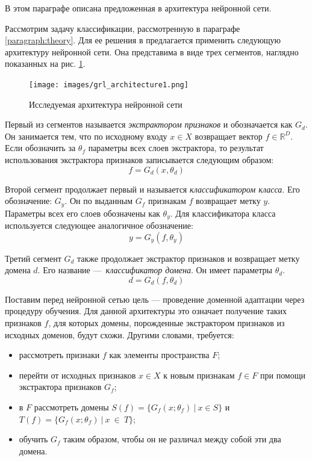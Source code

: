 \documentclass[14pt, a4paper]{extarticle}
\begin{document}
В этом параграфе описана предложенная в \cite{ganin} архитектура нейронной сети. 

Рассмотрим задачу классификации, рассмотренную в параграфе \ref{paragraph:theory}. Для ее решения в \cite{ganin} предлагается применить следующую архитектуру нейронной сети. Она представима в виде трех сегментов, наглядно показанных на рис. \ref{figure:architecture}.
 
\begin{figure}
	\texttt{[image: images/grl\_architecture1.png]}
	\caption{Исследуемая архитектура нейронной сети}
	\label{figure:architecture}
\end{figure}
 
Первый из сегментов называется \textit{экстрактором признаков} и обозначается как $G_d$. Он занимается тем, что по исходному входу $x \in X$ возвращает вектор $f \in \mathbb{R}^D$. Если обозначить за $\theta_f$ параметры всех слоев экстрактора, то результат использования экстрактора признаков записывается следующим образом:
\begin{equation*}
	 f = G_d(x, \theta_d)
\end{equation*}
 
Второй сегмент продолжает первый и называется \textit{классификатором класса}. Его обозначение: $G_y$. Он по выданным $G_f$ признакам $f$ возвращает метку $y$. Параметры всех его слоев обозначены как $\theta_y$. Для классификатора класса используется следующее аналогичное обозначение:
\begin{equation*}
	y = G_y(f, \theta_y)
\end{equation*}
 
Третий сегмент $G_d$ также продолжает экстрактор признаков и возвращает метку домена $d$. Его название — \textit{классификатор домена}. Он имеет параметры $\theta_d$.
\begin{equation*}
	d = G_d(f, \theta_d)
\end{equation*}

Поставим перед нейронной сетью цель — проведение доменной адаптации через процедуру обучения.
Для данной архитектуры это означает получение таких признаков $f$, для которых домены, порожденные экстрактором признаков из исходных доменов, будут схожи. Другими словами, требуется:
\begin{itemize}
	\item рассмотреть признаки $f$ как элементы пространства $F$;
	\item перейти от исходных признаков $x \in X$ к новым признакам $f \in F$ при помощи экстрактора признаков $G_f$;
	\item в $F$ рассмотреть домены $S(f) = \{G_f(x; \theta_f)~|~x \in S \}$ и $T(f) = \{G_f(x; \theta_f)~|~x~\in~T\}$;
	\item обучить $G_f$ таким образом, чтобы он не различал между собой эти два домена.
\end{itemize}
\end{document}
